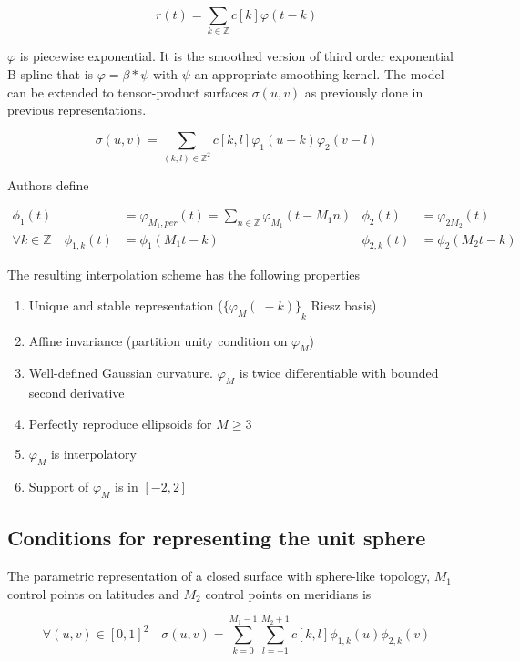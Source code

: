 \documentclass[a4paper, 11pt]{article}
\begin{document}
\begin{equation}
  r(t) = \sum_{k \in \mathbb{Z}} c[k]\varphi(t-k)
\end{equation}

$\varphi$ is piecewise exponential. It is the smoothed version of third order exponential B-spline that is $\varphi = 
\beta*\psi$ with $\psi$ an appropriate smoothing kernel. The model can be extended to tensor-product surfaces $\sigma(u, 
v)$ as previously done in previous representations.  

\begin{equation*}
  \sigma(u,v) = \sum_{(k,l) \in \mathbb{Z}^2} c[k,l] \varphi_{1} (u-k)\varphi_2(v-l)
\end{equation*}

Authors define

\begin{align*}
  \phi_1(t) &= \varphi_{M_1, per}(t) = \sum_{n \in \mathbb{Z}} \varphi_{M_1}(t-M_1n) & \phi_2(t) &= \varphi_{2M_2}(t) \\
  \forall k \in \mathbb{Z} \quad \phi_{1,k}(t) &= \phi_1(M_1t-k) & \phi_{2,k}(t) &= \phi_2(M_2t-k)
\end{align*}

The resulting interpolation scheme has the following properties
\begin{enumerate}
  \item Unique and stable representation (${\{\varphi_M(.-k)\}}_{k}$ Riesz basis)
  \item Affine invariance (partition unity condition on  $\varphi_M$)
  \item Well-defined Gaussian curvature. $\varphi_M$ is twice differentiable with bounded second derivative
  \item Perfectly reproduce ellipsoids for $M \geq 3$
  \item $\varphi_M$ is interpolatory
  \item Support of $\varphi_M$ is in $[-2, 2]$
\end{enumerate}

\subsection{Conditions for representing the unit sphere}

The parametric representation of a closed surface with sphere-like topology, $M_1$ control points on latitudes and $M_2$ 
control points on meridians is

\begin{equation}
  \forall (u, v) \in {[0,1]}^2 \quad \sigma(u,v) = \sum_{k=0}^{M_1-1} \sum_{l=-1}^{M_2+1} c[k,l] 
\phi_{1,k}(u)\phi_{2,k}(v) 
\end{equation}
\end{document}
